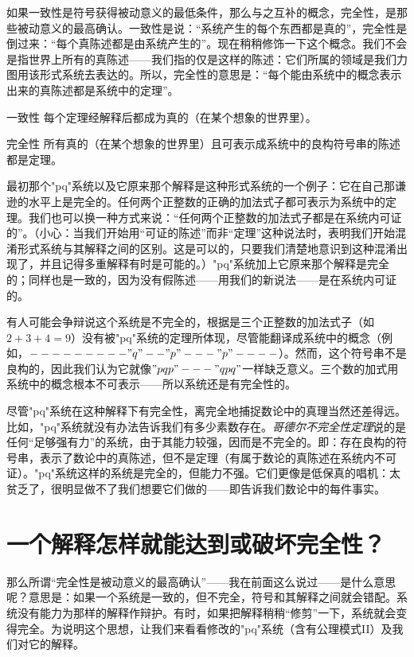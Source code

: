 如果一致性是符号获得被动意义的最低条件，那么与之互补的概念，完全性，是那些被动意义的最高确认。一致性是说：“系统产生的每个东西都是真的”，完全性是倒过来：“每个真陈述都是由系统产生的”。现在稍稍修饰一下这个概念。我们不会是指世界上所有的真陈述——我们指的仅是这样的陈述：它们所属的领域是我们力图用该形式系统去表达的。所以，完全性的意思是：“每个能由系统中的概念表示出来的真陈述都是系统中的定理”。
\begin{thm}{一致性}
每个定理经解释后都成为真的（在某个想象的世界里）。
\end{thm}
\begin{thm}{完全性}
所有真的（在某个想象的世界里）且可表示成系统中的良构符号串的陈述都是定理。
\end{thm}
最初那个"pq"系统以及它原来那个解释是这种形式系统的一个例子：它在自己那谦逊的水平上是完全的。任何两个正整数的正确的加法式子都可表示为系统中的定理。我们也可以换一种方式来说：“任何两个正整数的加法式子都是在系统内可证的”。（小心：当我们开始用“可证的陈述”而非“定理”这种说法时，表明我们开始混淆形式系统与其解释之间的区别。这是可以的，只要我们清楚地意识到这种混淆出现了，并且记得多重解释有时是可能的。）"pq"系统加上它原来那个解释是完全的；同样也是一致的，因为没有假陈述——用我们的新说法——是在系统内可证的。

有人可能会争辩说这个系统是不完全的，根据是三个正整数的加法式子（如$2+3+4=9$）没有被"pq"系统的定理所体现，尽管能翻译成系统中的概念（例如，$---------"q"--"p"---"p"----$）。然而，这个符号串不是良构的，因此我们认为它就像$"pqp"---"qpq"$一样缺乏意义。三个数的加式用系统中的概念根本不可表示——所以系统还是有完全性的。

尽管"pq"系统在这种解释下有完全性，离完全地捕捉数论中的真理当然还差得远。比如，"pq"系统就没有办法告诉我们有多少素数存在。\emph{哥德尔不完全性定理}说的是任何“足够强有力”的系统，由于其能力较强，因而是不完全的。即：存在良构的符号串，表示了数论中的真陈述，但不是定理（有属于数论的真陈述在系统内不可证）。"pq"系统这样的系统是完全的，但能力不强。它们更像是低保真的唱机：太贫乏了，很明显做不了我们想要它们做的——即告诉我们数论中的每件事实。

\section{一个解释怎样就能达到或破坏完全性？}

那么所谓“完全性是被动意义的最高确认”——我在前面这么说过——是什么意思呢？意思是：如果一个系统是一致的，但不完全，符号和其解释之间就会错配。系统没有能力为那样的解释作辩护。有时，如果把解释稍稍“修剪”一下，系统就会变得完全。为说明这个思想，让我们来看看修改的"pq"系统（含有公理模式II）及我们对它的解释。


